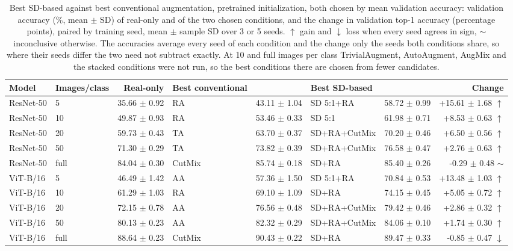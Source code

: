 \begin{table}[H]
\centering
\small
\setlength{\tabcolsep}{4pt}
\caption{Best SD-based against best conventional augmentation, pretrained initialization, both chosen by mean validation accuracy: validation accuracy (\%, mean $\pm$ SD) of real-only and of the two chosen conditions, and the change in validation top-1 accuracy (percentage points), paired by training seed, mean $\pm$ sample SD over 3 or 5 seeds. $\uparrow$ gain and $\downarrow$ loss when every seed agrees in sign, $\sim$ inconclusive otherwise. The accuracies average every seed of each condition and the change only the seeds both conditions share, so where their seeds differ the two need not subtract exactly. At 10 and full images per class TrivialAugment, AutoAugment, AugMix and the stacked conditions were not run, so the best conditions there are chosen from fewer candidates.}
\label{tab:augment-best-pretrained}
\begin{tabular}{llrlrlrr}
\toprule
Model & Images/class & Real-only & Best conventional & & Best SD-based & & Change \\
\midrule
ResNet-50 & 5 & 35.66 $\pm$ 0.92 & RA & 43.11 $\pm$ 1.04 & SD 5:1+RA & 58.72 $\pm$ 0.99 & +15.61 $\pm$ 1.68 $\uparrow$ \\
ResNet-50 & 10 & 49.87 $\pm$ 0.93 & RA & 53.46 $\pm$ 0.33 & SD 5:1 & 61.98 $\pm$ 0.71 & +8.53 $\pm$ 0.63 $\uparrow$ \\
ResNet-50 & 20 & 59.73 $\pm$ 0.43 & TA & 63.70 $\pm$ 0.37 & SD+RA+CutMix & 70.20 $\pm$ 0.46 & +6.50 $\pm$ 0.56 $\uparrow$ \\
ResNet-50 & 50 & 71.30 $\pm$ 0.29 & TA & 73.82 $\pm$ 0.39 & SD+RA+CutMix & 76.58 $\pm$ 0.47 & +2.76 $\pm$ 0.63 $\uparrow$ \\
ResNet-50 & full & 84.04 $\pm$ 0.30 & CutMix & 85.74 $\pm$ 0.18 & SD+RA & 85.40 $\pm$ 0.26 & -0.29 $\pm$ 0.48 $\sim$ \\
ViT-B/16 & 5 & 46.49 $\pm$ 1.42 & AA & 57.36 $\pm$ 1.50 & SD 5:1+RA & 70.84 $\pm$ 0.53 & +13.48 $\pm$ 1.03 $\uparrow$ \\
ViT-B/16 & 10 & 61.29 $\pm$ 1.03 & RA & 69.10 $\pm$ 1.09 & SD+RA & 74.15 $\pm$ 0.45 & +5.05 $\pm$ 0.72 $\uparrow$ \\
ViT-B/16 & 20 & 72.15 $\pm$ 0.78 & AA & 76.56 $\pm$ 0.48 & SD+RA+CutMix & 79.42 $\pm$ 0.46 & +2.86 $\pm$ 0.32 $\uparrow$ \\
ViT-B/16 & 50 & 80.13 $\pm$ 0.23 & AA & 82.32 $\pm$ 0.29 & SD+RA+CutMix & 84.06 $\pm$ 0.10 & +1.74 $\pm$ 0.30 $\uparrow$ \\
ViT-B/16 & full & 88.64 $\pm$ 0.23 & CutMix & 90.43 $\pm$ 0.22 & SD+RA & 89.47 $\pm$ 0.33 & -0.85 $\pm$ 0.47 $\downarrow$ \\
\bottomrule
\end{tabular}
\end{table}
